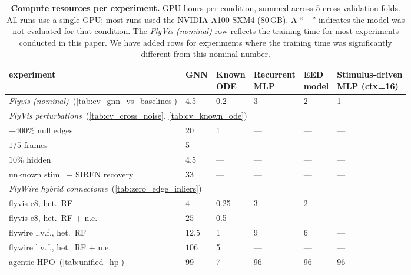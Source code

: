 
\begin{table}[h]
\centering
\caption{\textbf{Compute resources per experiment.} GPU-hours per condition,
summed across 5 cross-validation folds. All runs use a single GPU; most runs used the
NVIDIA A100 SXM4 (80\,GB).
A ``---'' indicates the model was not evaluated for that condition. The \emph{FlyVis (nominal)}
row reflects the training time for most experiments conducted in this paper. We have added rows
for experiments where the training time was significantly different from this nominal number.
}
\label{tab:compute_resources}
\small
\setlength{\tabcolsep}{6pt}
\begin{tabular}{llllll}
\toprule
experiment & GNN & \shortstack[l]{Known\\ODE} & \shortstack[l]{Recurrent\\MLP} & \shortstack[l]{EED\\model} & \shortstack[l]{Stimulus-driven\\MLP (ctx=16)}\\
\midrule
\emph{Flyvis (nominal)}~(\cref{tab:cv_gnn_vs_baselines}) & 4.5 & 0.2 & 3 & 2 & 1 \\
\midrule
\multicolumn{6}{l}{\emph{FlyVis perturbations}~(\cref{tab:cv_cross_noise}, \cref{tab:cv_known_ode})} \\
\quad $+400\%$ null edges                   & 20  & 1   & ---  & ---  & --- \\
\quad $1/5$ frames                          & 5  & --- & ---  & ---  & --- \\
\quad $10\%$ hidden           & 4.5  & --- & ---  & ---  & --- \\
\quad unknown stim.\ $+$ SIREN recovery     & 33  & --- & ---  & ---  & --- \\
\midrule
\multicolumn{6}{l}{\emph{FlyWire hybrid connectome}~(\cref{tab:zero_edge_inliers})} \\
\quad flyvis e8, het.\ RF                       & $4 $          & 0.25           & 3 & 2 & --- \\
\quad flyvis e8, het.\ RF $+$ n.e.              & $25$     & 0.5     & --- & --- & --- \\
\quad flywire l.v.f., het.\ RF                  & $12.5$     & 1           & 9 & 6 & --- \\
\quad flywire l.v.f., het.\ RF $+$ n.e.         & $106$    & 5     & --- & --- & --- \\
\midrule
agentic HPO~(\cref{tab:unified_hp})     & 99 & 7  & 96  & 96  & 96 \\
\bottomrule
\end{tabular}
\end{table}



